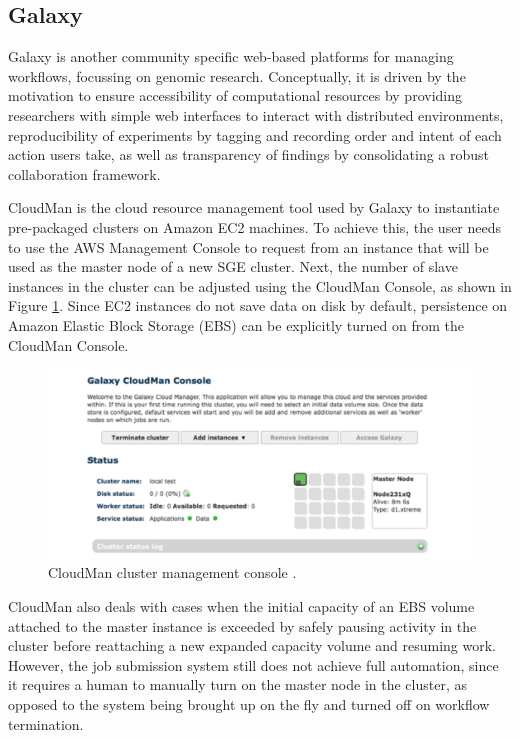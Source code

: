 \documentclass[11pt,a4paper]{report}
\begin{document}
\subsection{Galaxy}

Galaxy \cite{Goecks2010} is another community specific web-based platforms for managing workflows, focussing on genomic research. Conceptually, it is driven by the motivation to ensure accessibility of computational resources by providing researchers with simple web interfaces to interact with distributed environments, reproducibility of experiments by tagging and recording order and intent of each action users take, as well as transparency of findings by consolidating a robust collaboration framework.

CloudMan \cite{Afgan2010} is the cloud resource management tool used by Galaxy to instantiate pre-packaged clusters on Amazon EC2 machines. To achieve this, the user needs to use the AWS Management Console to request from an instance that will be used as the master node of a new SGE cluster. Next, the number of slave instances in the cluster can be adjusted using the CloudMan Console, as shown in Figure \ref{CloudManConsole}. Since EC2 instances do not save data on disk by default, persistence on Amazon Elastic Block Storage (EBS) can be explicitly turned on from the CloudMan Console.



\begin{figure}[h]
	\centering
		\includegraphics[scale=0.40]{figures/CloudManConsole.png}
	\caption{CloudMan cluster management console \cite{Afgan2010}.}
	\label{CloudManConsole}
\end{figure}

CloudMan also deals with cases when the initial capacity of an EBS volume attached to the master instance is exceeded by safely pausing activity in the cluster before reattaching a new expanded capacity volume and resuming work. However, the job submission system still does not achieve full automation, since it requires a human to manually turn on the master node in the cluster, as opposed to the system being brought up on the fly and turned off on workflow termination.
\end{document}
